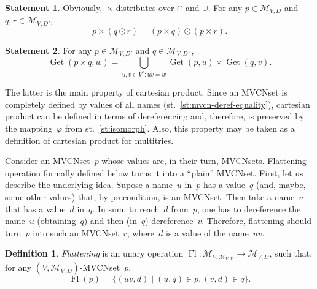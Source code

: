 \documentclass{article}
\theoremstyle{definition}
\newtheorem{Df}{Definition}
\newtheorem{St}{Statement}
\newcommand{\setcharmvcn}{M}
\newcommand{\setsymbol}[3]{\mathcal{#1}_{#2,#3}}
\newcommand{\setmvcn}[2]{\setsymbol{\setcharmvcn}{#1}{#2}}
\newcommand{\flatten}{\operatorname{Fl}}
\newcommand{\deref}{\operatorname{Get}}
\begin{document}
\begin{St}\label{st:cartesian-distributivity}
Obviously,~$\times$ distributes over $\cap$ and $\cup$.
For any $p \in \setmvcn{V}{D}$ and $q, r \in \setmvcn{V}{D'}$,
\[
  p\times(q\odot r) = (p\times q) \odot (p\times r) .
\]
\end{St}

\begin{St}\label{st:deref-cartesian}
For any $p \in \setmvcn{V}{D'}$ and $q \in \setmvcn{V}{D''}$,
\[
  \deref(p \times q, w) =
      \bigcup_{u,v\in V^\ast: uv = w}
          \deref(p, u)
          \times
          \deref(q, v) .
\]
\end{St}

The latter is the main property of cartesian product. Since an MVCNset is
completely defined by values of all names (st.~\ref{st:mvcn-deref-equality}),
cartesian product can be defined in terms of dereferencing and, therefore,
is preserved by the mapping~$\varphi$ from st.~\ref{st:isomorph}. Also, this
property may be taken as a definition of cartesian product for multitries.

Consider an MVCNset~$p$ whose values are, in their turn, MVCNsets.
Flattening operation formally defined below turns it into a ``plain'' MVCNset.
First, let us describe the underlying idea. Supose a name~$u$ in~$p$ has a
value~$q$ (and, maybe, some other values) that, by precondition, is an
MVCNset.  Then take a name~$v$ that has a value~$d$ in~$q$. In sum, to
reach~$d$ from~$p$, one has to dereference the name~$u$ (obtaining~$q$) and
then (in~$q$) dereference~$v$. Therefore, flattening should turn~$p$ into
such an MVCNset~$r$, where~$d$ is a value of the name~$uv$.
\begin{Df}\label{df:flatten}
\emph{Flattening} is an unary operation
$\flatten : \setmvcn{V}{\setmvcn{V}{D}} \to\setmvcn{V}{D}$,
such that, for any $(V,\setmvcn{V}{D})$-MVCNset~$p$,
\[
  \flatten(p) = \{ (uv, d) \mid (u, q) \in p, (v, d) \in q \} .
\]
\end{Df}
\end{document}

